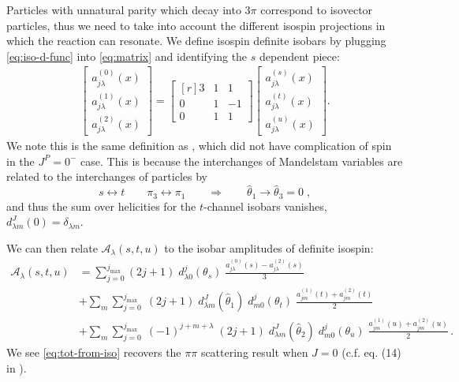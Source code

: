 \documentclass[10pt, aps,prd,amsmath,amssymb,superscriptaddress,onecolumn,
nofootinbib,showpacs,preprintnumbers]{revtex4-1}
\newcommand{\jmax}{{j_\text{max}}}
\begin{document}
Particles with unnatural parity which decay into \(3\pi\) correspond to isovector particles, thus we need to take into account the different isospin projections in which the reaction can resonate.
We define isospin definite isobars by plugging \cref{eq:iso-d-func} into \cref{eq:matrix} and identifying the \(s\) dependent piece:
\begin{align}
  \begin{bmatrix}
  a^{(0)}_{j\lambda}(x) \\ a^{(1)}_{j\lambda}(x) \\ a^{(2)}_{j\lambda}(x)
  \end{bmatrix}
=
  \begin{bmatrix*}[r]
    3 & 1 & 1 \\ 	0 & 1 & -1 \\ 0 & 1 & 1
  \end{bmatrix*}
  \begin{bmatrix}
  a^{(s)}_{j\lambda}(x) \\ a^{(t)}_{j\lambda}(x) \\ a^{(u)}_{j\lambda}(x)
  \end{bmatrix}.
\end{align}
We note this is the same definition as \cite{Albaladejo2018}, which did not have complication of spin in the \(J^P = 0^-\) case. This is because the interchanges of Mandelstam variables are related to the interchanges of particles by
  \begin{equation}
    s\leftrightarrow  t  \qquad \pi_3 \leftrightarrow \pi_1 \qquad \Rightarrow \qquad \hat{\theta}_1 \to \hat{\theta}_3 = 0 \; ,
  \end{equation}
and thus the sum over helicities for the \(t\)-channel isobars vanishes, \(d_{\lambda m}^J(0) = \delta_{\lambda m} \).

We can then relate \(\mathcal{A}_\lambda(s,t,u)\) to the isobar amplitudes of definite isospin:
  \begin{align}
    \label{eq:tot-from-iso}
    \mathcal{A}_\lambda(s,t,u) &= \sum_{j = 0}^\jmax
      (2j + 1) \; d_{\lambda 0}^j(\theta_s) \;
      \frac{
     a_{j \lambda}^{(0)}(s) - a_{j \lambda}^{(2)}(s)
     }{
     3
     } \nonumber \\
     &+ \sum_m \sum_{j=0}^\jmax \; (2j+1)
     \; d^{J}_{\lambda m}(\hat{\theta}_1) \; d_{m0}^j(\theta_t) \;
     \frac{
     a^{(1)}_{j m}(t) + a^{(2)}_{j m}(t)
     }{
     2
     } \\
     &+ \sum_m \sum_{j=0}^\jmax \; (-1)^{j + m + \lambda} \; (2j+1)
     \; d^{J}_{\lambda m}(\hat{\theta}_2) \; d_{m0}^j(\theta_u) \;
     \frac{
     a^{(1)}_{jm}(u) + a^{(2)}_{j m}(u)
     }{
     2
     } \, . \nonumber
  \end{align}
We see \cref{eq:tot-from-iso} recovers the \(\pi\pi\) scattering result when \(J = 0\) (c.f. eq. (14) in \cite{Albaladejo2018}).
\end{document}
